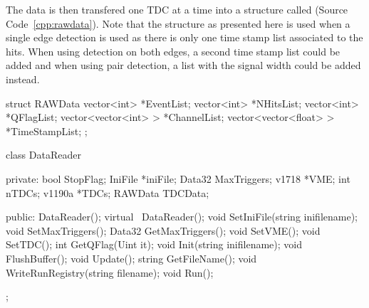 	The data is then transfered one TDC at a time into a structure called  (Source Code~\ref{cpp:rawdata}). Note that the structure as presented here is used when a single edge detection is used as there is only one time stamp list associated to the hits. When using detection on both edges, a second time stamp list could be added and when using pair detection, a list with the signal width could be added instead.\\
	
	\begin{code}
    \begin{cppcode}
struct RAWData{
    vector<int>            *EventList;
    vector<int>            *NHitsList;
    vector<int>            *QFlagList;
    vector<vector<int> >   *ChannelList;
    vector<vector<float> > *TimeStampList;
};
    \end{cppcode}
	\label{cpp:rawdata}
	\vspace{5mm}
    \end{code}
	
	\begin{code}
    \begin{cppcode}
class DataReader
{
    private:
        bool     StopFlag;
        IniFile *iniFile;
        Data32   MaxTriggers;
        v1718   *VME;
        int      nTDCs;
        v1190a  *TDCs;
        RAWData  TDCData;

    public:
        DataReader();
        virtual ~DataReader();
        void     SetIniFile(string inifilename);
        void     SetMaxTriggers();
        Data32   GetMaxTriggers();
        void     SetVME();
        void     SetTDC();
        int      GetQFlag(Uint it);
        void     Init(string inifilename);
        void     FlushBuffer();
        void     Update();
        string   GetFileName();
        void     WriteRunRegistry(string filename);
        void     Run();
};
    \end{cppcode}
	\label{cpp:datareader}
	\vspace{5mm}
    \end{code}

